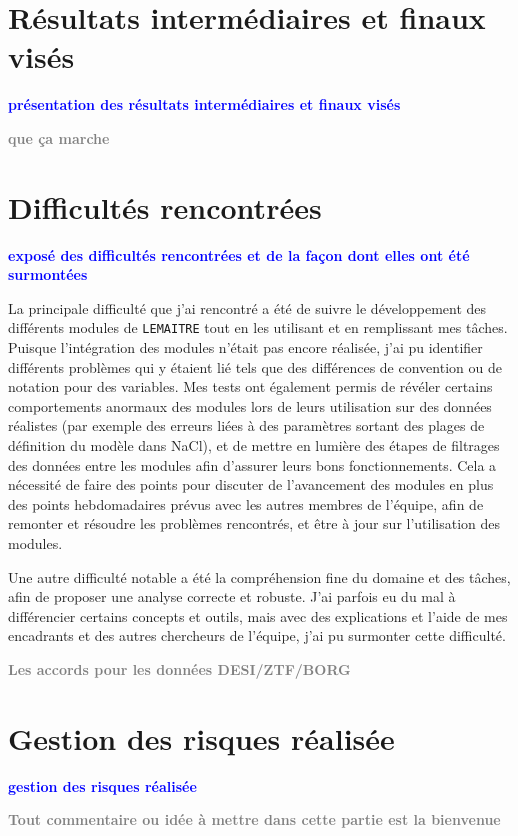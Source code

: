 \documentclass{book}
\newcommand{\todo}[1]{{\textcolor{gray}{\bf \large #1}}}
\newcommand{\consignes}[1]{{\textcolor{blue}{\bf \large #1}}}
\begin{document}
\section{Résultats intermédiaires et finaux visés}
\consignes{présentation des résultats intermédiaires et finaux visés}

\todo{que ça marche}

\section{Difficultés rencontrées}
\consignes{exposé des difficultés rencontrées et de la façon dont elles ont été surmontées}

La principale difficulté que j'ai rencontré a été de suivre le développement des différents modules de \verb|LEMAITRE| tout en les utilisant et en remplissant mes tâches. Puisque l'intégration des modules n'était pas encore réalisée, j'ai pu identifier différents problèmes qui y étaient lié tels que des différences de convention ou de notation pour des variables. Mes tests ont également permis de révéler certains comportements anormaux des modules lors de leurs utilisation sur des données réalistes (par exemple des erreurs liées à des paramètres sortant des plages de définition du modèle dans NaCl), et de mettre en lumière des étapes de filtrages des données entre les modules afin d'assurer leurs bons fonctionnements. Cela a nécessité de faire des points pour discuter de l'avancement des modules en plus des points hebdomadaires prévus avec les autres membres de l'équipe, afin de remonter et résoudre les problèmes rencontrés, et être à jour sur l'utilisation des modules.

Une autre difficulté notable a été la compréhension fine du domaine et des tâches, afin de proposer une analyse correcte et robuste. J'ai parfois eu du mal à différencier certains concepts et outils, mais avec des explications et l'aide de mes encadrants et des autres chercheurs de l'équipe, j'ai pu surmonter cette difficulté.


\todo{Les accords pour les données DESI/ZTF/BORG}


\section{Gestion des risques réalisée}
\consignes{gestion des risques réalisée}

\todo{Tout commentaire ou idée à mettre dans cette partie est la bienvenue}
\end{document}
